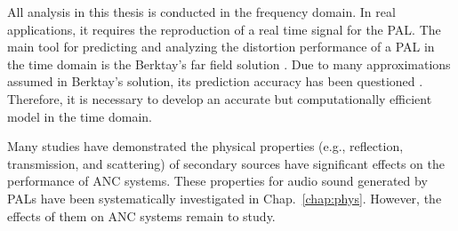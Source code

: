 \begin{outline}
    \1 {All analysis in this thesis is conducted in the frequency domain.
    In real applications, it requires the reproduction of a real time signal for the PAL.
    The main tool for predicting and analyzing the distortion performance of a PAL in the time domain is the Berktay's far field solution \cite{Berktay1965PossibleExploitationNonlinear}.
    Due to many approximations assumed in Berktay's solution, its prediction accuracy has been questioned \cite{Farias2015RayleighDistanceAbsorption, FariasAlvarez2018SoundPropagationNarrow}.
    Therefore, it is necessary to develop an accurate but computationally efficient model in the time domain.
}
    
    \1 {Many studies \cite{Boodoo2015ReviewEffectReflective, Tao2017PerformanceMultichannelActive, Zhong2019IncreasingPerformanceActive, Zhong2019IncreasingPerformanceActivea, Zhong2020PerformanceActiveNoise,  Sas1995ActiveControlSound, Tarabini2009ActiveControlNoisea, Zhang2017PerformanceSnoringNoise, Lin2004ActiveControlRadiation, Zou2008PerformanceAnalysisVirtual, Liu2018ActiveControlStrategy, Elliott2020ActiveControlSound} have demonstrated the physical properties (e.g., reflection, transmission, and scattering) of secondary sources have significant effects on the performance of ANC systems.
    These properties for audio sound generated by PALs have been systematically investigated in Chap.~\ref{chap:phys}.
    However, the effects of them on ANC systems remain to study.
}

\end{outline}
